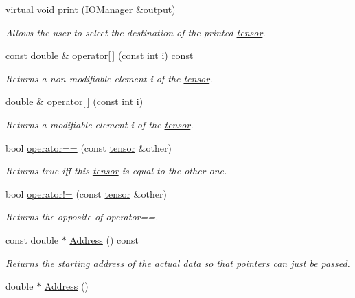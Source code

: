 \begin{DoxyCompactItemize}
virtual void \hyperlink{classJKBuilder_1_1tensor_a74b2fe351a5444c1325870dc6162f451}{print} (\hyperlink{classJKBuilder_1_1IOManager}{IOManager} \&output)
\begin{DoxyCompactList}\small\item\em Allows the user to select the destination of the printed \hyperlink{classJKBuilder_1_1tensor}{tensor}. \item\end{DoxyCompactList}\item 
const double \& \hyperlink{classJKBuilder_1_1tensor_a4f0dc1b84b580cec49500c70f87e084a}{operator\mbox{[}$\,$\mbox{]}} (const int i) const 
\begin{DoxyCompactList}\small\item\em Returns a non-\/modifiable element i of the \hyperlink{classJKBuilder_1_1tensor}{tensor}. \item\end{DoxyCompactList}\item 
double \& \hyperlink{classJKBuilder_1_1tensor_a38c9fed6b117f7cf8b76785648d76b62}{operator\mbox{[}$\,$\mbox{]}} (const int i)
\begin{DoxyCompactList}\small\item\em Returns a modifiable element i of the \hyperlink{classJKBuilder_1_1tensor}{tensor}. \item\end{DoxyCompactList}\item 
bool \hyperlink{classJKBuilder_1_1tensor_a10ae0b61e655854d12c6465d2b9e3506}{operator==} (const \hyperlink{classJKBuilder_1_1tensor}{tensor} \&other)
\begin{DoxyCompactList}\small\item\em Returns true iff this \hyperlink{classJKBuilder_1_1tensor}{tensor} is equal to the other one. \item\end{DoxyCompactList}\item 
bool \hyperlink{classJKBuilder_1_1tensor_a9b42dd835ddf2eb1a26b5d525b59b2b8}{operator!=} (const \hyperlink{classJKBuilder_1_1tensor}{tensor} \&other)
\begin{DoxyCompactList}\small\item\em Returns the opposite of operator==. \item\end{DoxyCompactList}\item 
const double $\ast$ \hyperlink{classJKBuilder_1_1tensor_a6a4e024f566d3bf9ba32a349afc5bbcf}{Address} () const 
\begin{DoxyCompactList}\small\item\em Returns the starting address of the actual data so that pointers can just be passed. \item\end{DoxyCompactList}\item 
double $\ast$ \hyperlink{classJKBuilder_1_1tensor_ac982d9eb84092bfc13694448dd824cbc}{Address} ()
\end{DoxyCompactItemize}
